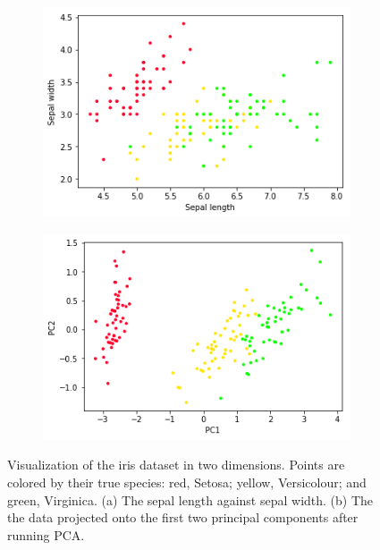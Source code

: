 \documentclass[a4paper]{article}
\begin{document}
\begin{figure}[h!]
	\centering
	\begin{subfigure}[t]{0.4\textwidth}
		\includegraphics[width = \textwidth]{./data_figs/iris_data.png}
		\subcaption{}
	\end{subfigure}
  \begin{subfigure}[t]{0.4\textwidth}
    \includegraphics[width = \textwidth]{./data_figs/pca_iris_data.png}
    \subcaption{}
  \end{subfigure}
	\caption{Visualization of the iris dataset in two dimensions. Points are colored by their
  true species: red, Setosa; yellow, Versicolour;
  and green, Virginica. (a) The sepal length against sepal width. (b) The
  the data projected onto the first two principal components after running PCA.
  }
	\label{fig:iris_data}
\end{figure}
\end{document}
